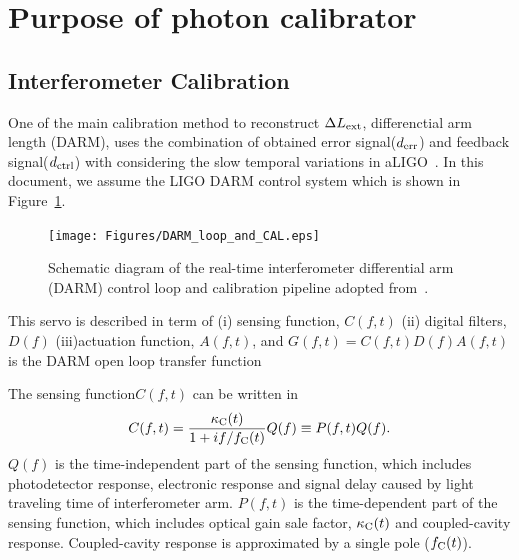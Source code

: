  

\section{Purpose of photon calibrator}
\subsection{Interferometer Calibration}\label{sec:darm_calib}

One of the main calibration method to reconstruct $\Delta L_{\rm ext}$, differenctial arm length (DARM), 
uses the combination of obtained error signal($d_{\rm err}$) and feedback signal($d_{\rm ctrl}$) 
with considering the slow temporal variations in 
aLIGO~\cite{LIGO-CAL,Tuyenbayev}.
In this document, we assume the LIGO DARM control system which is shown in Figure~\ref{fig:L_DARM_control_loop}.
\begin{figure}
\begin{center}
\texttt{[image: Figures/DARM\_loop\_and\_CAL.eps]}
\caption{Schematic diagram of the real-time interferometer differential 
arm (DARM) control loop and calibration pipeline adopted 
from~\cite{LIGO-CAL,Tuyenbayev}.}
\label{fig:L_DARM_control_loop} 
\end{center}
\end{figure}
This servo is described in term of 
(i) sensing function, $C(f,t)$ 
(ii) digital filters, $D(f)$ 
(iii)actuation function, $A(f,t)$, 
and $G(f,t) = C(f,t)D(f)A(f,t)$ is the DARM open loop transfer function  

The sensing function$C(f,t)$ can be written in
\begin{equation}
C(f,t) = \frac{\kappa_{\rm C}(t)}{1+if/f_{\rm C}(t)}Q(f) \equiv P(f,t) Q(f).
\end{equation}
$Q(f)$ is the time-independent part of the sensing function, which includes
photodetector response,
electronic response
and signal delay caused by light traveling time of interferometer arm.
$P(f,t)$ is the time-dependent part of the sensing function, which includes
optical gain sale factor, $\kappa_{\rm C}(t)$ and coupled-cavity response.
Coupled-cavity response is approximated by a single pole ($f_{\rm C}(t)$).

